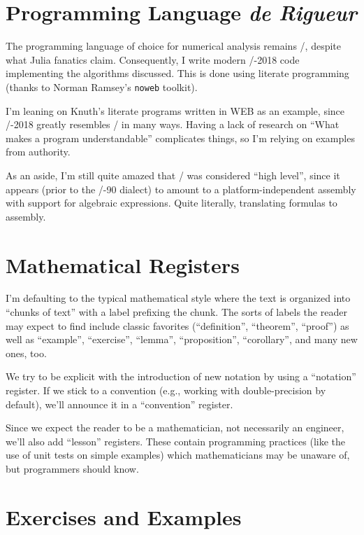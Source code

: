 \section*{Programming Language \textit{de Rigueur}}

The programming language of choice for numerical analysis remains
\FORTRAN/, despite what Julia fanatics claim. Consequently, I write
modern \FORTRAN/-2018 code implementing the algorithms discussed. This is
done using literate programming (thanks to Norman Ramsey's {\tt noweb}
toolkit).

I'm leaning on Knuth's literate programs written in WEB as an example,
since \FORTRAN/-2018 greatly resembles \PASCAL/ in many ways. Having a
lack of research on ``What makes a program understandable'' complicates
things, so I'm relying on examples from authority.

As an aside, I'm still quite amazed that \FORTRAN/ was considered ``high
level'', since it appears (prior to the \FORTRAN/-90 dialect) to amount
to a platform-independent assembly with support for algebraic expressions.
Quite literally, translating formulas to assembly.

\section*{Mathematical Registers}

I'm defaulting to the typical mathematical style where the text is
organized into ``chunks of text'' with a label prefixing the chunk. The
sorts of labels the reader may expect to find include classic favorites
(``definition'', ``theorem'', ``proof'') as well as ``example'',
``exercise'', ``lemma'', ``proposition'', ``corollary'', and many new
ones, too.

We try to be explicit with the introduction of new notation by using a
``notation'' register. If we stick to a convention (e.g., working with
double-precision by default), we'll announce it in a ``convention'' register.

Since we expect the reader to be a mathematician, not necessarily an
engineer, we'll also add ``lesson'' registers. These contain programming
practices (like the use of unit tests on simple examples) which
mathematicians may be unaware of, but programmers should know.

\section*{Exercises and Examples}

